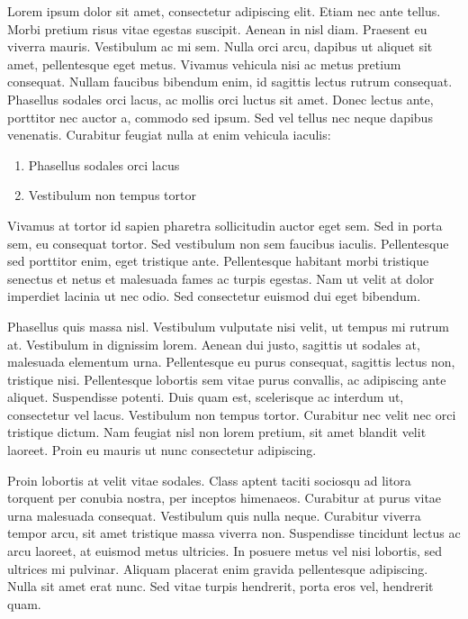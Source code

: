 \documentclass[a4paper,12pt]{texMemo}
\begin{document}
\maketitle %
Lorem ipsum dolor sit amet, consectetur adipiscing elit. Etiam nec ante tellus. Morbi pretium risus vitae egestas suscipit. Aenean in nisl diam. Praesent eu viverra mauris. Vestibulum ac mi sem. Nulla orci arcu, dapibus ut aliquet sit amet, pellentesque eget metus. Vivamus vehicula nisi ac metus pretium consequat. Nullam faucibus bibendum enim, id sagittis lectus rutrum consequat. Phasellus sodales orci lacus, ac mollis orci luctus sit amet. Donec lectus ante, porttitor nec auctor a, commodo sed ipsum. Sed vel tellus nec neque dapibus venenatis. Curabitur feugiat nulla at enim vehicula iaculis:

\begin{enumerate}
\item Phasellus sodales orci lacus
\item Vestibulum non tempus tortor
\end{enumerate}

Vivamus at tortor id sapien pharetra sollicitudin auctor eget sem. Sed in porta sem, eu consequat tortor. Sed vestibulum non sem faucibus iaculis. Pellentesque sed porttitor enim, eget tristique ante. Pellentesque habitant morbi tristique senectus et netus et malesuada fames ac turpis egestas. Nam ut velit at dolor imperdiet lacinia ut nec odio. Sed consectetur euismod dui eget bibendum.

Phasellus quis massa nisl. Vestibulum vulputate nisi velit, ut tempus mi rutrum at. Vestibulum in dignissim lorem. Aenean dui justo, sagittis ut sodales at, malesuada elementum urna. Pellentesque eu purus consequat, sagittis lectus non, tristique nisi. Pellentesque lobortis sem vitae purus convallis, ac adipiscing ante aliquet. Suspendisse potenti. Duis quam est, scelerisque ac interdum ut, consectetur vel lacus. Vestibulum non tempus tortor. Curabitur nec velit nec orci tristique dictum. Nam feugiat nisl non lorem pretium, sit amet blandit velit laoreet. Proin eu mauris ut nunc consectetur adipiscing.

Proin lobortis at velit vitae sodales. Class aptent taciti sociosqu ad litora torquent per conubia nostra, per inceptos himenaeos. Curabitur at purus vitae urna malesuada consequat. Vestibulum quis nulla neque. Curabitur viverra tempor arcu, sit amet tristique massa viverra non. Suspendisse tincidunt lectus ac arcu laoreet, at euismod metus ultricies. In posuere metus vel nisi lobortis, sed ultrices mi pulvinar. Aliquam placerat enim gravida pellentesque adipiscing. Nulla sit amet erat nunc. Sed vitae turpis hendrerit, porta eros vel, hendrerit quam.
\end{document}
